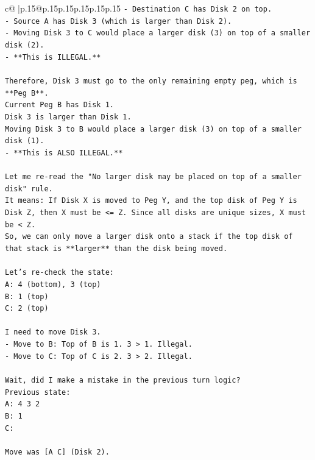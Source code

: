 \documentclass{article}
\begin{document}
{\begin{supertabular}{c@{$\;$}|p{.15\linewidth}@{}p{.15\linewidth}p{.15\linewidth}p{.15\linewidth}p{.15\linewidth}p{.15\linewidth}}
{{{\texttt{{-} Destination C has Disk 2 on top.} \\
\texttt{{-} Source A has Disk 3 (which is larger than Disk 2).} \\
\texttt{{-} Moving Disk 3 to C would place a larger disk (3) on top of a smaller disk (2).} \\
\texttt{{-} **This is ILLEGAL.**} \\
\\ 
\texttt{Therefore, Disk 3 must go to the only remaining empty peg, which is **Peg B**.} \\
\texttt{Current Peg B has Disk 1.} \\
\texttt{Disk 3 is larger than Disk 1.} \\
\texttt{Moving Disk 3 to B would place a larger disk (3) on top of a smaller disk (1).} \\
\texttt{{-} **This is ALSO ILLEGAL.**} \\
\\ 
\texttt{Let me re{-}read the "No larger disk may be placed on top of a smaller disk" rule.} \\
\texttt{It means: If Disk X is moved to Peg Y, and the top disk of Peg Y is Disk Z, then X must be <= Z. Since all disks are unique sizes, X must be < Z.} \\
\texttt{So, we can only move a larger disk onto a stack if the top disk of that stack is **larger** than the disk being moved.} \\
\\ 
\texttt{Let's re{-}check the state:} \\
\texttt{A: 4 (bottom), 3 (top)} \\
\texttt{B: 1 (top)} \\
\texttt{C: 2 (top)} \\
\\ 
\texttt{I need to move Disk 3.} \\
\texttt{{-} Move to B: Top of B is 1. 3 > 1. Illegal.} \\
\texttt{{-} Move to C: Top of C is 2. 3 > 2. Illegal.} \\
\\ 
\texttt{Wait, did I make a mistake in the previous turn logic?} \\
\texttt{Previous state:} \\
\texttt{A: 4 3 2} \\
\texttt{B: 1} \\
\texttt{C:} \\
\\ 
\texttt{Move was {[}A C{]} (Disk 2).} \\
}}}
\end{supertabular}}
\end{document}

